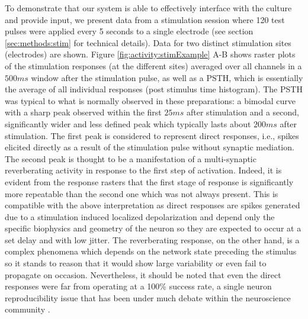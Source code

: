     To demonstrate that our system is able to effectively interface with the culture and provide input, we present data from a stimulation session where 120 test pulses were applied every 5 seconds to a single electrode (see section \ref{sec:methods:stim} for technical details). Data for two distinct stimulation sites (electrodes) are shown. Figure \ref{fig:activity:stimExample} A-B shows raster plots of the stimulation responses (at the different sites) averaged over all channels in a \(500 ms\) window after the stimulation pulse, as well as a PSTH, which is essentially the average of all individual responses (post stimulus time histogram). The PSTH was typical to what is normally observed in these preparations: a bimodal curve with a sharp peak observed within the first \(25 ms\) after stimulation and a second, significantly wider and less defined peak which typically lasts about \(200 ms\) after stimulation. The first peak is considered to represent direct responses, i.e., spikes elicited directly as a result of the stimulation pulse without synaptic mediation. The second peak is thought to be a manifestation of a multi-synaptic reverberating activity in response to the first step of activation. Indeed, it is evident from the response rasters that the first stage of response is significantly more repeatable than the second one which was not always present. This is compatible with the above interpretation as direct responses are spikes generated due to a stimulation induced localized depolarization and depend only the specific biophysics and geometry of the neuron so they are expected to occur at a set delay and with low jitter. The reverberating response, on the other hand, is a complex phenomena which depends on the network state preceding the stimulus so it stands to reason that it would show large variability or even fail to propagate on occasion. Nevertheless, it should be noted that even the direct responses were far from operating at a 100\% success rate, a single neuron reproducibility issue that has been under much debate within the neuroscience community \cite{mainen1995reliability,gal2013entrainment}.

